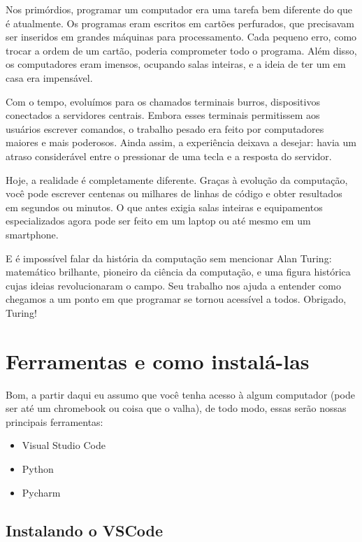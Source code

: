 \documentclass[12pt]{book}
\begin{document}
	Nos primórdios, programar um computador era uma tarefa bem diferente do que é atualmente. Os programas eram escritos em cartões perfurados, que precisavam ser inseridos em grandes máquinas para processamento. Cada pequeno erro, como trocar a ordem de um cartão, poderia comprometer todo o programa. Além disso, os computadores eram imensos, ocupando salas inteiras, e a ideia de ter um em casa era impensável.
	
	Com o tempo, evoluímos para os chamados terminais burros, dispositivos conectados a servidores centrais. Embora esses terminais permitissem aos usuários escrever comandos, o trabalho pesado era feito por computadores maiores e mais poderosos. Ainda assim, a experiência deixava a desejar: havia um atraso considerável entre o pressionar de uma tecla e a resposta do servidor.
	
	Hoje, a realidade é completamente diferente. Graças à evolução da computação, você pode escrever centenas ou milhares de linhas de código e obter resultados em segundos ou minutos. O que antes exigia salas inteiras e equipamentos especializados agora pode ser feito em um laptop ou até mesmo em um smartphone.
	
	E é impossível falar da história da computação sem mencionar Alan Turing: matemático brilhante, pioneiro da ciência da computação, e uma figura histórica cujas ideias revolucionaram o campo. Seu trabalho nos ajuda a entender como chegamos a um ponto em que programar se tornou acessível a todos. Obrigado, Turing!
	
	\section{Ferramentas e como instalá-las}
	
	Bom, a partir daqui eu assumo que você tenha acesso à algum computador (pode ser até um chromebook ou coisa que o valha), de todo modo, essas serão nossas principais ferramentas:
	
	\begin{itemize}
		\item Visual Studio Code
		\item Python
		\item Pycharm
	\end{itemize}

	\subsection{Instalando o VSCode}
	
\end{document}
